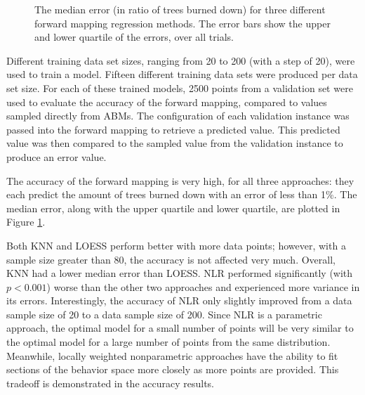 \begin{figure}[ht]
\caption{The median error (in ratio of trees burned down) for three different forward mapping regression methods.
The error bars show the upper and lower quartile of the errors, over all trials.}
\label{fig:fmacc}
\end{figure}

Different training data set sizes, ranging from 20 to 200 (with a step of 20), were used to train a model.
Fifteen different training data sets were produced per data set size.
For each of these trained models, 2500 points from a validation set were used to evaluate the accuracy of the forward mapping, compared to values sampled directly from ABMs.
The configuration of each validation instance was passed into the forward mapping to retrieve a predicted value.
This predicted value was then compared to the sampled value from the validation instance to produce an error value.

The accuracy of the forward mapping is very high, for all three approaches: they each predict the amount of trees burned down with an error of less than 1\%.
The median error, along with the upper quartile and lower quartile, are plotted in Figure \ref{fig:fmacc}.

Both KNN and LOESS perform better with more data points; however, with a sample size greater than 80, the accuracy is not affected very much.
Overall, KNN had a lower median error than LOESS.
NLR performed significantly (with $p < 0.001$) worse than the other two approaches and experienced more variance in its errors.
Interestingly, the accuracy of NLR only slightly improved from a data sample size of 20 to a data sample size of 200.
Since NLR is a parametric approach, the optimal model for a small number of points will be very similar to the optimal model for a large number of points from the same distribution.
Meanwhile, locally weighted nonparametric approaches have the ability to fit sections of the behavior space more closely as more points are provided.
This tradeoff is demonstrated in the accuracy results.


